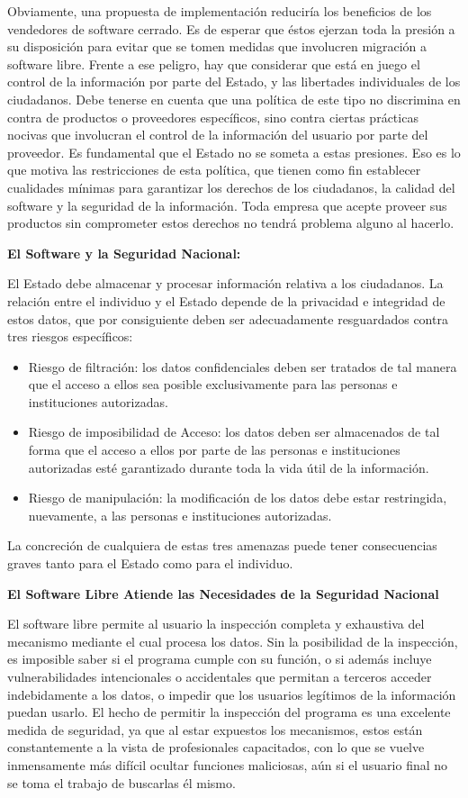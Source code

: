Obviamente, una propuesta de implementación reduciría los beneficios de los vendedores de software cerrado. Es de esperar que éstos ejerzan toda la presión a su disposición para evitar que se tomen medidas que involucren migración a software libre. Frente a ese peligro, hay que considerar que está en juego el control de la información por parte del Estado, y las libertades individuales de los ciudadanos. Debe tenerse en cuenta que una política de este tipo no discrimina en contra de productos o proveedores específicos, sino contra ciertas prácticas nocivas que involucran el control de la información del usuario por parte del proveedor. Es fundamental que el Estado no se someta a estas presiones. Eso es lo que motiva las restricciones de esta política, que tienen como fin establecer cualidades mínimas para garantizar los derechos de los ciudadanos, la calidad del software y la seguridad de la información. Toda empresa que acepte proveer sus productos sin comprometer estos derechos no tendrá problema alguno al hacerlo.


  {\bf El Software y la Seguridad Nacional:}
 
 El Estado debe almacenar y procesar información relativa a los ciudadanos. La relación entre el individuo y el Estado depende de la privacidad e integridad de estos datos, que por consiguiente deben ser adecuadamente resguardados contra tres riesgos específicos:
 
\begin{itemize}
\item  Riesgo de filtración: los datos confidenciales deben ser tratados de tal manera que el acceso a ellos sea posible exclusivamente para las personas e instituciones autorizadas.
\item   Riesgo de imposibilidad de Acceso: los datos deben ser almacenados de tal forma que el acceso a ellos por parte de las personas e instituciones autorizadas esté garantizado durante toda la vida útil de la información.
\item Riesgo de manipulación: la modificación de los datos debe estar restringida, nuevamente, a las personas e instituciones autorizadas.
\end{itemize}
La concreción de cualquiera de estas tres amenazas puede tener consecuencias graves tanto para el Estado como para el individuo. 

{\bf  El Software Libre Atiende las Necesidades de la Seguridad Nacional}

El software libre permite al usuario la inspección completa y exhaustiva del mecanismo mediante el cual procesa los datos. Sin la posibilidad de la inspección, es imposible saber si el programa cumple con su función, o si además incluye vulnerabilidades intencionales o accidentales que permitan a terceros acceder indebidamente a los datos, o impedir que los usuarios legítimos de la información puedan usarlo. 
El hecho de permitir la inspección del programa es una excelente medida de seguridad, ya que al estar expuestos los mecanismos, estos están constantemente a la vista de profesionales capacitados, con lo que se vuelve inmensamente más difícil ocultar funciones maliciosas, aún si el usuario final no se toma el trabajo de buscarlas él mismo.

